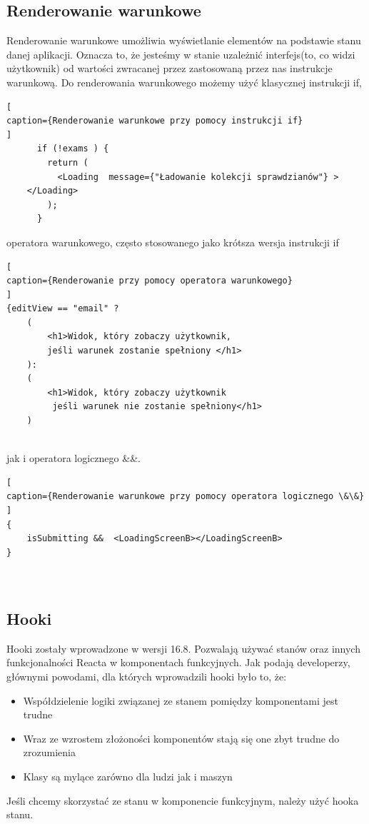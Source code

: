 \documentclass[oneside,polski,logo,indent]{amuthesis}
\begin{document}
\subsection{Renderowanie warunkowe}

Renderowanie warunkowe umożliwia wyświetlanie elementów na podstawie stanu danej aplikacji. Oznacza to, że jesteśmy w stanie uzależnić interfejs(to, co widzi użytkownik) od wartości zwracanej przez zastosowaną przez nas instrukcje warunkową.
Do renderowania warunkowego możemy użyć klasycznej instrukcji if,
\begin{lstlisting}[
caption={Renderowanie warunkowe przy pomocy instrukcji if}
]
      if (!exams ) {
        return (
          <Loading  message={"Ładowanie kolekcji sprawdzianów"} >
	</Loading>
        );
      }

\end{lstlisting}

operatora warunkowego, często stosowanego jako krótsza wersja instrukcji if

\begin{lstlisting}[
caption={Renderowanie przy pomocy operatora warunkowego}
]
{editView == "email" ?
	(
		<h1>Widok, który zobaczy użytkownik,
		jeśli warunek zostanie spełniony </h1>
	):
	(
		<h1>Widok, który zobaczy użytkownik
		 jeśli warunek nie zostanie spełniony</h1>
	)


\end{lstlisting}



\pagebreak
jak i operatora logicznego \&\&.

\begin{lstlisting}[
caption={Renderowanie warunkowe przy pomocy operatora logicznego \&\&}
]
{
	isSubmitting &&  <LoadingScreenB></LoadingScreenB>
}  



\end{lstlisting}




\subsection{Hooki}
Hooki zostały wprowadzone w wersji 16.8. Pozwalają używać stanów oraz innych funkcjonalności Reacta w komponentach funkcyjnych.
\newline
Jak podają developerzy, głównymi powodami, dla których wprowadzili hooki było to, że:
\begin{itemize}
\item Współdzielenie logiki związanej ze stanem pomiędzy komponentami jest trudne
\item Wraz ze wzrostem złożoności komponentów stają się one zbyt trudne do zrozumienia
\item Klasy są mylące zarówno dla ludzi jak i maszyn
\end{itemize}
Jeśli chcemy skorzystać ze stanu w komponencie funkcyjnym, należy użyć hooka stanu.
\end{document}
